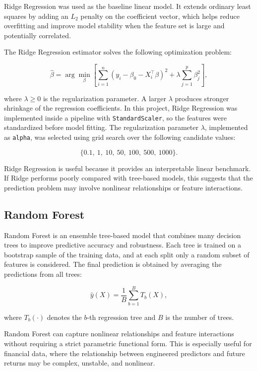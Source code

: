 \documentclass[12pt]{article}
\begin{document}
Ridge Regression was used as the baseline linear model. It extends ordinary least squares by adding an $L_2$ penalty on the coefficient vector, which helps reduce overfitting and improve model stability when the feature set is large and potentially correlated.

The Ridge Regression estimator solves the following optimization problem:

\begin{equation}
\hat{\beta}
=
\arg\min_{\beta}
\left[
\sum_{i=1}^{n}
(y_i - \beta_0 - X_i^\top \beta)^2
+
\lambda \sum_{j=1}^{p} \beta_j^2
\right],
\end{equation}

where $\lambda \ge 0$ is the regularization parameter. A larger $\lambda$ produces stronger shrinkage of the regression coefficients. In this project, Ridge Regression was implemented inside a pipeline with \texttt{StandardScaler}, so the features were standardized before model fitting. The regularization parameter $\lambda$, implemented as \texttt{alpha}, was selected using grid search over the following candidate values:

\[
\{0.1,\ 1,\ 10,\ 50,\ 100,\ 500,\ 1000\}.
\]

Ridge Regression is useful because it provides an interpretable linear benchmark. If Ridge performs poorly compared with tree-based models, this suggests that the prediction problem may involve nonlinear relationships or feature interactions.

\subsection{Random Forest}

Random Forest is an ensemble tree-based model that combines many decision trees to improve predictive accuracy and robustness. Each tree is trained on a bootstrap sample of the training data, and at each split only a random subset of features is considered. The final prediction is obtained by averaging the predictions from all trees:

\begin{equation}
\hat{y}(X)
=
\frac{1}{B}
\sum_{b=1}^{B}
T_b(X),
\end{equation}

where $T_b(\cdot)$ denotes the $b$-th regression tree and $B$ is the number of trees.

Random Forest can capture nonlinear relationships and feature interactions without requiring a strict parametric functional form. This is especially useful for financial data, where the relationship between engineered predictors and future returns may be complex, unstable, and nonlinear.
\end{document}
